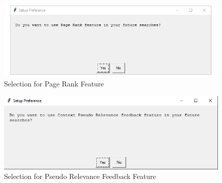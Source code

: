\begin{figure}[h!]
    \begin{center}
        \includegraphics[scale=0.8]{res1}
        \caption{Selection for Page Rank Feature}
    \end{center}
\end{figure}
\begin{figure}[h!]
    \begin{center}
        \includegraphics[scale=0.8]{res2}
        \caption{Selection for Pseudo Relevance Feedback Feature}
    \end{center}
\end{figure}

